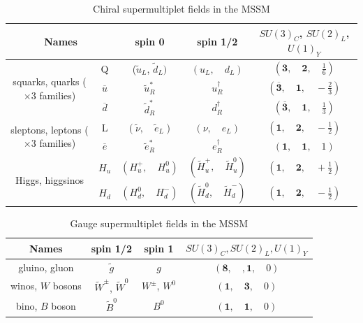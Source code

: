\documentclass[12pt]{report}
\begin{document}
\begin{table}[htdp]
\begin{center}
{\renewcommand{\arraystretch}{1.5}%
\begin{tabular}{|c|c|c|c|c|}
\hline
\multicolumn{2}{|c|}{Names} & spin 0 & spin 1/2 & $SU(3)_{C}$, $SU(2)_{L}$, $U(1)_{Y}$\\
\hline
\hline
\multirow{3}{3cm}{squarks, quarks ($\times 3$ families)} &Q & ($\widetilde{u}_{L}$, \quad $\widetilde{d}_{L})$ & $(u_{L}, \quad d_{L})$ & $(\mathbf{3}, \quad \mathbf{2}, \quad \frac{1}{6})$\\
& $\overline{u}$ & $\widetilde{u}^{*}_{R}$ & $u^{\dag}_{R}$ & $(\overline{\mathbf{3}}, \quad \mathbf{1}, \quad -\frac{2}{3})$\\
& $\overline{d}$ & $\widetilde{d}^{*}_{R}$ & $d^{\dag}_{R}$ & $(\overline{\mathbf{3}}, \quad \mathbf{1}, \quad \frac{1}{3})$\\
\hline
\multirow{2}{3cm}{sleptons, leptons ($\times 3$ families)} & L & $(\widetilde{\nu}, \quad \widetilde{e}_{L})$ & $(\nu, \quad e_{L})$ & $(\mathbf{1}, \quad \mathbf{2}, \quad -\frac{1}{2})$\\
& $\overline{e}$ & $\widetilde{e}^{*}_{R}$ & $e^{\dag}_{R}$ & $(\mathbf{1}, \quad \mathbf{1}, \quad 1)$\\
\hline
\multirow{2}{*}{Higgs, higgsinos} & $H_{u}$ & $(H^{+}_{u}, \quad H^{0}_{u})$ & $(\widetilde{H}^{+}_{u}, \quad \widetilde{H}^{0}_{u})$ & $(\mathbf{1}, \quad \mathbf{2}, \quad +\frac{1}{2})$\\
& $H_{d}$ & $(H^{0}_{d}, \quad H^{-}_{d})$ & $(\widetilde{H}^{0}_{d}, \quad \widetilde{H}^{-}_{d})$ & $(\mathbf{1}, \quad \mathbf{2}, \quad -\frac{1}{2})$\\
\hline
\end{tabular}
}%
\end{center}
\caption{Chiral supermultiplet fields in the MSSM}
\label{table: chiral supermultiplets in the MSSM}
\end{table}%

\begin{table}[htdp]
\begin{center}
{\renewcommand{\arraystretch}{1.5}%
\begin{tabular}{|c|c|c|c|}
\hline
Names & spin 1/2 & spin 1 & $SU(3)_{C}, SU(2)_{L}, U(1)_{Y}$\\ 
\hline
\hline
gluino, gluon & $\widetilde{g}$ & $g$ & $(\mathbf{8}, \quad, \mathbf{1}, \quad 0)$\\
\hline
winos, $W$ bosons & $\widetilde{W}^{\pm}$, $\widetilde{W}^{0}$ & $W^{\pm}$, $W^{0}$ & $(\mathbf{1}, \quad \mathbf{3}, \quad 0)$\\
\hline
bino, $B$ boson & $\widetilde{B}^{0}$ & $B^{0}$ & $(\mathbf{1}, \quad \mathbf{1}, \quad 0)$\\
\hline
\end{tabular}
} %
\end{center}
\caption{Gauge supermultiplet fields in the MSSM}
\label{table: gauge supermultiplets in the MSSM}
\end{table}%
\end{document}
